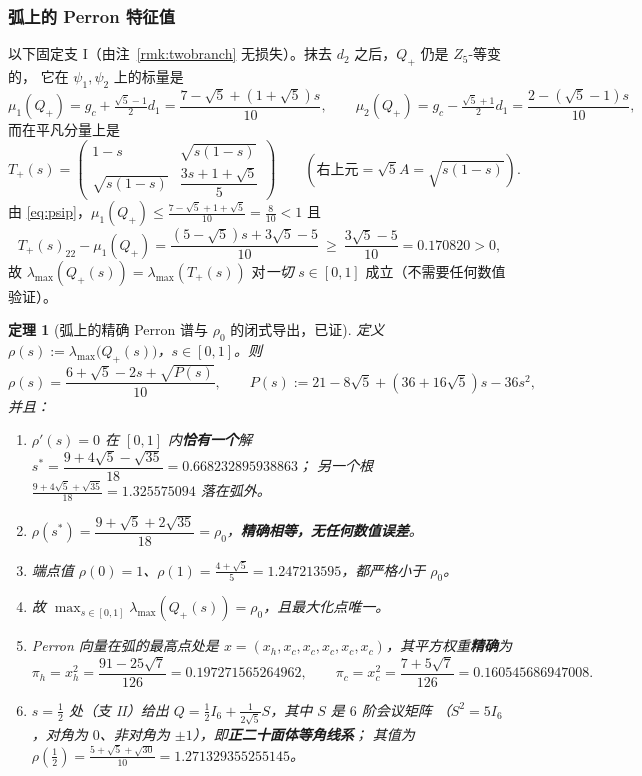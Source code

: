\documentclass[UTF8,11pt]{ctexart}
\newtheorem{theorem}{定理}[section]
\theoremstyle{definition}
\begin{document}
\subsubsection*{弧上的 Perron 特征值}

以下固定支 I（由注~\ref{rmk:twobranch} 无损失）。抹去 $d_2$ 之后，$Q_+$ 仍是 $Z_5$-等变的，
它在 $\psi_1,\psi_2$ 上的标量是
\begin{equation}\label{eq:psip}
\mu_1(Q_+)=g_c+\tfrac{\sqrt5-1}2d_1=\frac{7-\sqrt5+(1+\sqrt5)s}{10},\qquad
\mu_2(Q_+)=g_c-\tfrac{\sqrt5+1}2d_1=\frac{2-(\sqrt5-1)s}{10},
\end{equation}
而在平凡分量上是
\[
T_+(s)=\begin{pmatrix}1-s & \sqrt{s(1-s)}\\[2pt] \sqrt{s(1-s)} & \dfrac{3s+1+\sqrt5}{5}\end{pmatrix}
\qquad(\text{右上元}=\sqrt5A=\sqrt{s(1-s)}).
\]
由 \eqref{eq:psip}，$\mu_1(Q_+)\le\frac{7-\sqrt5+1+\sqrt5}{10}=\frac8{10}<1$ 且
\[
T_+(s)_{22}-\mu_1(Q_+)=\frac{(5-\sqrt5)s+3\sqrt5-5}{10}\ \ge\ \frac{3\sqrt5-5}{10}=0.170820>0 ,
\]
故 $\lambda_{\max}(Q_+(s))=\lambda_{\max}(T_+(s))$ 对\emph{一切} $s\in[0,1]$ 成立（不需要任何数值验证）。

\begin{theorem}[弧上的精确 Perron 谱与 $\rho_0$ 的闭式导出，已证]\label{thm:conefam}
定义 $\rho(s):=\lambda_{\max}\bigl(Q_+(s)\bigr)$，$s\in[0,1]$。则
\begin{equation}\label{eq:rhos}
\rho(s)=\frac{6+\sqrt5-2s+\sqrt{P(s)}}{10},\qquad
P(s):=21-8\sqrt5+(36+16\sqrt5)s-36s^2,
\end{equation}
并且：
\begin{enumerate}[label=(\alph*),leftmargin=2.2em]
\item $\rho'(s)=0$ 在 $[0,1]$ 内\textbf{恰有一个}解
$s^*=\dfrac{9+4\sqrt5-\sqrt{35}}{18}=0.668232895938863$；
另一个根 $\frac{9+4\sqrt5+\sqrt{35}}{18}=1.325575094$ 落在弧外。
\item $\rho(s^*)=\dfrac{9+\sqrt5+2\sqrt{35}}{18}=\rho_0$，\textbf{精确相等，无任何数值误差}。
\item 端点值 $\rho(0)=1$、$\rho(1)=\frac{4+\sqrt5}5=1.247213595$，都严格小于 $\rho_0$。
\item 故 $\displaystyle\max_{s\in[0,1]}\lambda_{\max}(Q_+(s))=\rho_0$，且最大化点唯一。
\item Perron 向量在弧的最高点处是 $x=(x_h,x_c,x_c,x_c,x_c,x_c)$，其平方权重\textbf{精确}为
\begin{equation}\label{eq:perronw}
\pi_h=x_h^2=\frac{91-25\sqrt7}{126}=0.197271565264962,\qquad
\pi_c=x_c^2=\frac{7+5\sqrt7}{126}=0.160545686947008 .
\end{equation}
\item $s=\frac12$ 处（支 II）给出 $Q=\frac12I_6+\frac1{2\sqrt5}S$，其中 $S$ 是 $6$ 阶会议矩阵
（$S^2=5I_6$，对角为 $0$、非对角为 $\pm1$），即\textbf{正二十面体等角线系}；
其值为 $\rho(\frac12)=\frac{5+\sqrt5+\sqrt{30}}{10}=1.271329355255145$。
\end{enumerate}
\end{theorem}
\end{document}
